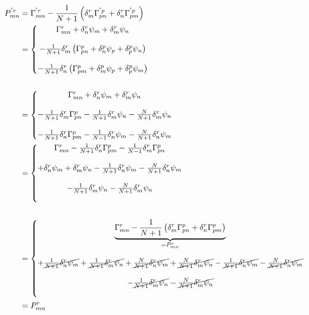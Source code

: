 \begin{align}
P^{'r}_{mn} &= \Gamma ^{'r}_{mn}-\frac{1}{N+1}\left(\delta^r_m \Gamma^{'p}_{pn}+  \delta^r_n \Gamma^{'p}_{pm} \right)\\
&=\left\{\begin{matrix}
 \Gamma^{r}_{mn} +\delta^r_n\psi_m +\delta^r_m\psi_n\\\\
 -\frac{1}{N+1}\delta^r_m \left(\Gamma^{p}_{pn} +\delta^p_n\psi_p +\delta^p_p\psi_n\right)\\\\
 -\frac{1}{N+1}  \delta^r_n \left(\Gamma^{p}_{pm} +\delta^p_m\psi_p +\delta^p_p\psi_m \right)\\
\end{matrix}\right.\\\\
&=\left\{\begin{matrix}
 \Gamma^{r}_{mn} +\delta^r_n\psi_m +\delta^r_m\psi_n\\\\
 -\frac{1}{N+1}\delta^r_m \Gamma^{p}_{pn} -\frac{1}{N+1}\delta^r_m \psi_n -\frac{N}{N+1}\delta^r_m \psi_n\\\\
 -\frac{1}{N+1}  \delta^r_n \Gamma^{p}_{pm} -\frac{1}{N-1}  \delta^r_n \psi_m -\frac{N}{N+1}  \delta^r_n \psi_m \\
\end{matrix}\right.\\
&=\left\{\begin{matrix}
 \Gamma^{r}_{mn} -\frac{1}{N+1}  \delta^r_n \Gamma^{p}_{pm}-\frac{1}{N-1}\delta^r_m \Gamma^{p}_{pn}\\\\
 +\delta^r_n\psi_m +\delta^r_m\psi_n -\frac{1}{N+1}  \delta^r_n \psi_m -\frac{N}{N+1}  \delta^r_n \psi_m \\\\
 -\frac{1}{N+1}\delta^r_m \psi_n -\frac{N}{N+1}\delta^r_m \psi_n\\\\
\end{matrix}\right.\\\\
&=\left\{\begin{matrix}
 \underbrace{\Gamma^{r}_{mn} -\frac{1}{N+1} \left( \delta^r_m \Gamma^{p}_{pn}+\delta^r_n \Gamma^{p}_{pm}\right)}_{=P^{r}_{mn}  }\\\\
 +\cancel{\frac{1}{N+1}\delta^r_n\psi_m }+\cancel{\frac{1}{N+1}\delta^r_m\psi_n} +\cancel{\frac{N}{N+1}\delta^r_n\psi_m} +\cancel{\frac{N}{N+1}\delta^r_m\psi_n}-\cancel{\frac{1}{N+1}  \delta^r_n \psi_m} -\cancel{\frac{N}{N+1}  \delta^r_n \psi_m }\\\\
 -\cancel{\frac{1}{N+1}\delta^r_m \psi_n} -\cancel{\frac{N}{N+1}\delta^r_m \psi_n}\\\\
\end{matrix}\right.\\
&= P^{r}_{mn}
\end{align}
